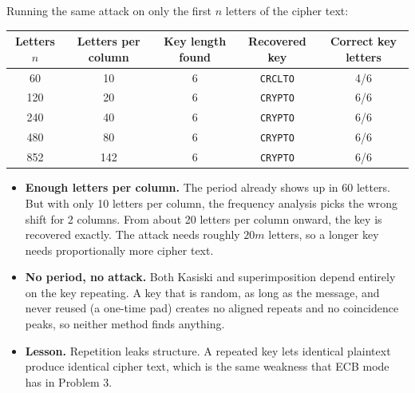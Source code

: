 \documentclass[a4paper, 10pt]{article}
\begin{document}
\begin{problem}
\begin{subproblems_alpha}
\begin{solution}
		      Running the same attack on only the first $n$ letters of the cipher text:
		      \begin{center}
			      \footnotesize
			      \begin{tabular}{ccccc}
				      \toprule
				      Letters $n$ & Letters per column & Key length found & Recovered key                             & Correct key letters \\
				      \midrule
				      60          & 10                 & 6                & \texttt{CR\textcolor{keywordcolor}{CL}TO} & 4/6                 \\
				      120         & 20                 & 6                & \texttt{CRYPTO}                           & 6/6                 \\
				      240         & 40                 & 6                & \texttt{CRYPTO}                           & 6/6                 \\
				      480         & 80                 & 6                & \texttt{CRYPTO}                           & 6/6                 \\
				      852         & 142                & 6                & \texttt{CRYPTO}                           & 6/6                 \\
				      \bottomrule
			      \end{tabular}
		      \end{center}
		      \begin{itemize}
			      \item \textbf{Enough letters per column.}
			            The period already shows up in 60 letters.
			            But with only 10 letters per column, the frequency analysis picks the wrong shift for 2 columns.
			            From about 20 letters per column onward, the key is recovered exactly.
			            The attack needs roughly $20m$ letters, so a longer key needs proportionally more cipher text.
			      \item \textbf{No period, no attack.}
			            Both Kasiski and superimposition depend entirely on the key repeating.
			            A key that is random, as long as the message, and never reused (a one-time pad) creates no aligned repeats and no coincidence peaks,
			            so neither method finds anything.
			      \item \textbf{Lesson.} Repetition leaks structure.
			            A repeated key lets identical plaintext produce identical cipher text, which is the same weakness that ECB mode has in Problem 3.
		      \end{itemize}


\end{solution}
\end{subproblems_alpha}
\end{problem}
\end{document}
